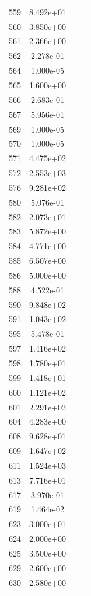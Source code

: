 \documentclass[12pt]{article}
\begin{document}
\begin{longtable}{@{}cccc@{}}
559 & 8.492e+01 &  &  \\
560 & 3.850e+00 &  &  \\
561 & 2.366e+00 &  &  \\
562 & 2.278e-01 &  &  \\
564 & 1.000e-05 &  &  \\
565 & 1.600e+00 &  &  \\
566 & 2.683e-01 &  &  \\
567 & 5.956e-01 &  &  \\
569 & 1.000e-05 &  &  \\
570 & 1.000e-05 &  &  \\
571 & 4.475e+02 &  &  \\
572 & 2.553e+03 &  &  \\
576 & 9.281e+02 &  &  \\
580 & 5.076e-01 &  &  \\
582 & 2.073e+01 &  &  \\
583 & 5.872e+00 &  &  \\
584 & 4.771e+00 &  &  \\
585 & 6.507e+00 &  &  \\
586 & 5.000e+00 &  &  \\
588 & 4.522e-01 &  &  \\
590 & 9.848e+02 &  &  \\
591 & 1.043e+02 &  &  \\
595 & 5.478e-01 &  &  \\
597 & 1.416e+02 &  &  \\
598 & 1.780e+01 &  &  \\
599 & 1.418e+01 &  &  \\
600 & 1.121e+02 &  &  \\
601 & 2.291e+02 &  &  \\
604 & 4.283e+00 &  &  \\
608 & 9.628e+01 &  &  \\
609 & 1.647e+02 &  &  \\
611 & 1.524e+03 &  &  \\
613 & 7.716e+01 &  &  \\
617 & 3.970e-01 &  &  \\
619 & 1.464e-02 &  &  \\
623 & 3.000e+01 &  &  \\
624 & 2.000e+00 &  &  \\
625 & 3.500e+00 &  &  \\
629 & 2.600e+00 &  &  \\
630 & 2.580e+00 &  &  \\

\end{longtable}
\end{document}
